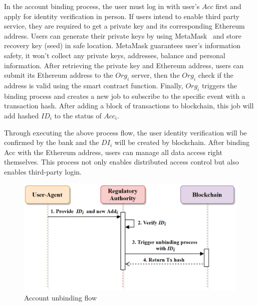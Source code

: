     In the account binding process, the user must log in with user's \(Acc\) first and apply for identity verification in person. If users intend to enable third party service, they are required to get a private key and its corresponding Ethereum address. Users can generate their private keys by using MetaMask~\cite{metamask} and store recovery key (seed) in safe location. MetaMask guarantees user's information safety, it won't collect any private keys, addresses, balance and personal information. After retrieving the private key and Ethereum address, users can submit its Ethereum address to the \(Org_i\) server, then the \(Org_i\) check if the address is valid using the smart contract function. Finally, \(Org_i\) triggers the binding process and creates a new job to subscribe to the specific event with a transaction hash. After adding a block of transactions to blockchain, this job will add hashed \(ID_i\) to the status of \(Acc_i\).\par
    Through executing the above process flow, the user identity verification will be confirmed by the bank and the \(DI_i\) will be created by blockchain. After binding Acc with the Ethereum address, users can manage all data access right themselves. This process not only enables distributed access control but also enables third-party login.

    \newpage

    \begin{figure}[htb]
        \centering
        \includegraphics[height=!,width=0.8\linewidth,keepaspectratio=true]{figures/account_unbinding.png}
        \caption{{\footnotesize Account unbinding flow}}
        \label{fig:accountunBinding}
    \end{figure}

